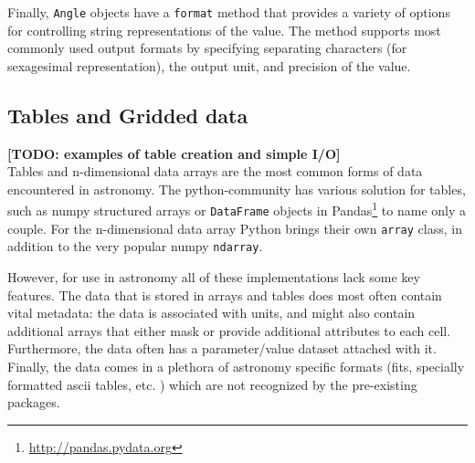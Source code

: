 \documentclass[traditabstract]{aa}
\begin{document}

Finally, \texttt{Angle} objects have a \texttt{format} method that provides a
variety of options for controlling string representations of the value. The
method supports most commonly used output formats by specifying separating
characters (for sexagesimal representation), the output unit, and precision of
the value.


%

\subsection{Tables and Gridded data}


\label{sec:table}

\textbf{[TODO: examples of table creation and simple I/O]}\\

Tables and n-dimensional data arrays are the most common forms of data
encountered in astronomy. The \gls{python}-community has various solution for
tables, such as \gls{numpy} structured arrays or \texttt{DataFrame} objects in Pandas\footnote{\url{http://pandas.pydata.org}} to name
only a couple. For the n-dimensional data array Python brings their own
\texttt{array} class, in addition to the very popular \gls{numpy}
\texttt{ndarray}.

However, for use in astronomy all of these implementations lack some key
features. The data that is stored in arrays and tables does most often contain
vital metadata: the data is associated with units, and might also contain
additional arrays that either mask or provide additional attributes to each
cell. Furthermore, the data often has a parameter/value dataset attached with
it. Finally, the data comes in a plethora of astronomy specific formats (fits,
specially formatted ascii tables, etc. ) which are not recognized by the
pre-existing packages.
\end{document}
